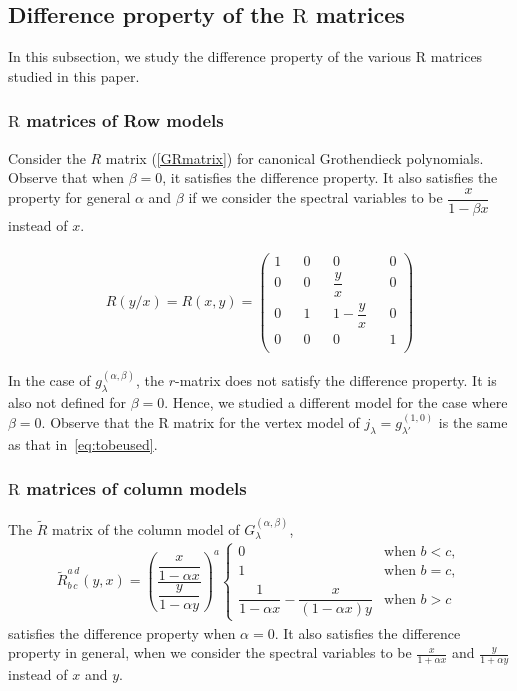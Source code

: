 \documentclass[ALCO, Unicode]{cedram}
\newcommand\g{{g^{(\alpha,\beta)}_{\lambda}}}
\newcommand\Gg{{G^{(\alpha,\beta)}_{\lambda}}}
\begin{document}
\subsection{Difference property of the \texorpdfstring{$\mathrm R$}{R} matrices}
In this subsection, we study the difference property of the various $\mathrm R$ matrices studied in this paper. 

\subsubsection{\texorpdfstring{$\mathrm R$}{R} matrices of Row models}
Consider the $R$ matrix (\eqref{GRmatrix}) for canonical Grothendieck polynomials. Observe that when $\beta=0$, it satisfies the difference property. 
It also satisfies the property for general $\alpha$ and $\beta$ if we consider the spectral variables to be $\dfrac{x}{1-\beta x}$ instead of $x$.


\begin{align}
\label{eq:tobeused}
R(y/x)=R(x,y)=
\begin{pmatrix}
1 &{}& 0 &{}& 0 &{}& 0 \\[1ex]
0 &{}& 0 &{}&  \dfrac{y}{x} &{}& 0 \\[1ex]
0 &{}& 1 &{}& {1}- \dfrac{y}{x} &{}& 0 \\[1ex]
0 &{}& 0 &{}& 0 &{}& 1 \\
\end{pmatrix}
\end{align}

In the case of $\g$, the $r$-matrix does not satisfy the difference property. 
It is also not defined for $\beta=0$. 
Hence, we studied a different model for the case where $\beta=0$. 
Observe that the $\mathrm{R}$ matrix for the vertex model of $j_{\lambda}=g^{(1,0)}_{\lambda'}$ is the same as that in~\eqref{eq:tobeused}.

\subsubsection{\texorpdfstring{$\mathrm R$}{R} matrices of column models}
The $\widetilde{R}$ matrix of the column model of $\Gg$,
\begin{align*}
\widetilde{R}^{a\,d}_{b\,c}\left(y,x\right) = \left({\dfrac{\dfrac{x}{1-\alpha x}}{\dfrac{y}{1-\alpha y}}}\right)^{a}
  \begin{cases}
    0 & \text{when } b<c,\\
   1 & \text{when } b=c ,\\
  \dfrac{1}{1-\alpha x}-\dfrac{x}{(1-\alpha x)y} & \text{when } b>c
  \end{cases}
\end{align*}
satisfies the difference property when $\alpha=0$. 
It also satisfies the difference property in general, when we consider the spectral variables to be $\frac{x}{1+\alpha x}$ and $\frac{y}{1+\alpha y}$ instead of $x$ and $y$.
\end{document}
